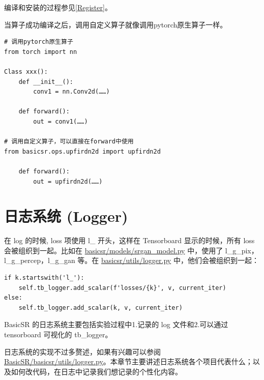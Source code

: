 \documentclass[../main.tex]{subfiles}
\begin{document}
\begin{note} %
    编译和安装的过程参见\ref{Register}。
\end{note}

当算子成功编译之后，调用自定义算子就像调用pytorch原生算子一样。


\begin{verbatim}
# 调用pytorch原生算子
from torch import nn

Class xxx():
    def __init__():
        conv1 = nn.Conv2d(……)

    def forward():
        out = conv1(……)

# 调用自定义算子，可以直接在forward中使用
from basicsr.ops.upfirdn2d import upfirdn2d

    def forward():
        out = upfirdn2d(……)

\end{verbatim}


\section{日志系统 (Logger)} \label{code_structure:logger}



在 log 的时候, loss 项使用 l\_ 开头，这样在 Tensorboard 显示的时候，所有 loss 会被组织到一起。比如在 \href{https://github.com/XPixelGroup/BasicSR/blob/master/basicsr/models/srgan_model.py}{basicsr/models/srgan\_model.py} 中，使用了 l\_g\_pix，l\_g\_percep，l\_g\_gan 等。在 \href{https://github.com/XPixelGroup/BasicSR/blob/master/basicsr/utils/logger.py}{basicsr/utils/logger.py} 中，他们会被组织到一起：
\begin{verbatim}
if k.startswith('l_'):
    self.tb_logger.add_scalar(f'losses/{k}', v, current_iter)
else:
    self.tb_logger.add_scalar(k, v, current_iter)
\end{verbatim}

BasicSR 的日志系统主要包括实验过程中1.记录的 log 文件和2.可以通过 tensorboard 可视化的 tb\_logger。

日志系统的实现不过多赘述，如果有兴趣可以参阅 \href{https://github.com/XPixelGroup/BasicSR/blob/master/basicsr/utils/logger.py}{BasicSR/basicsr/utils/logger.py}。本章节主要讲述日志系统各个项目代表什么；以及如何改代码，在日志中记录我们想记录的个性化内容。
\end{document}
